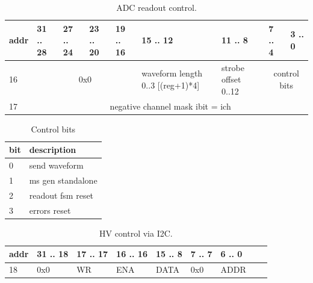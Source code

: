 \documentclass{article}
\begin{document}
\begin{table}[H]
\centering
\begin{tabular}{| l | l | l | l | l | l | l | l | l |}
\hline
addr & 31 .. 28 & 27 .. 24 & 23 .. 20 & 19 .. 16 & 15 .. 12 & 11 .. 8 & 7 .. 4 & 3 .. 0 \\ \hline
16 & \multicolumn{4}{c|}{0x0} & waveform length 0..3 [(reg+1)*4] & strobe offset 0..12 & \multicolumn{2}{c|}{control bits} \\ \hline
17 & \multicolumn{8}{c|}{negative channel mask ibit = ich} \\ \hline
\end{tabular}
\caption{ADC readout control.\label{tab5}}
\end{table}

\begin{table}[H]
\centering
\begin{tabular}{| l | l |}
\hline
bit & description \\ \hline
0 & send waveform \\ \hline
1 & ms gen standalone \\ \hline
2 & readout fsm reset \\ \hline
3 & errors reset \\ \hline
\end{tabular}
\caption{Control bits\label{tab6}}
\end{table}


\begin{table}[H]
\centering
\begin{tabular}{| l | l | l | l | l | l | l | l | l |}
\hline
addr & 31 .. 18 & 17 .. 17 & 16 .. 16 & 15 .. 8 & 7 .. 7 & 6 .. 0 \\ \hline
18 & 0x0 & WR & ENA & DATA & 0x0 & ADDR \\ \hline
\end{tabular}
\caption{HV control via I2C.\label{tab7}}
\end{table}
\end{document}
